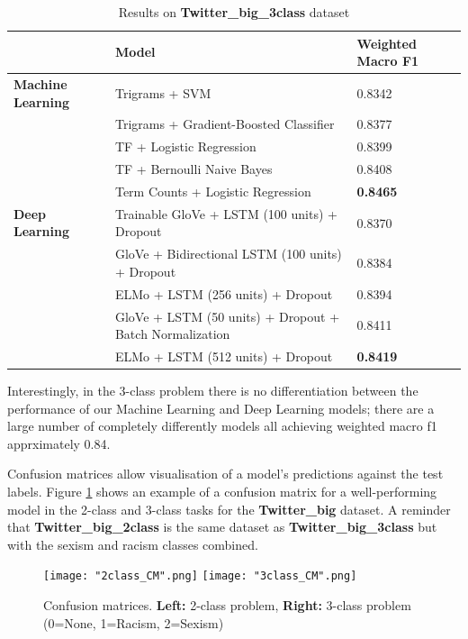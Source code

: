 \documentclass[12pt,a4paper]{article}
\begin{document}
\begin{table}[H]
	\centering
	\vspace*{-12pt}
	\caption{Results on \textbf{Twitter\_big\_3class} dataset}
	\label{results4}
	\hspace*{-1.5cm}
	\begin{tabular}{p{3.4cm} p{10.5cm} p{3.8cm}} \hline\hline
		& \textbf{Model} & \textbf{Weighted Macro F1}  \\ \hline
		
     \textbf{Machine Learning} & Trigrams + SVM & 0.8342 \\
	& Trigrams + Gradient-Boosted Classifier & 0.8377 \\
	& TF + Logistic Regression & 0.8399 \\
	& TF + Bernoulli Naive Bayes & 0.8408 \\
	& Term Counts + Logistic Regression & \textbf{0.8465} \\ \hline
	
	\textbf{Deep Learning} & Trainable GloVe + LSTM (100 units) + Dropout & 0.8370  \\  
	& GloVe + Bidirectional LSTM (100 units) + Dropout & 0.8384  \\
	& ELMo + LSTM (256 units) + Dropout & 0.8394  \\
	& GloVe + LSTM (50 units) + Dropout + Batch Normalization & 0.8411 \\ 
	& ELMo + LSTM (512 units) + Dropout & \textbf{0.8419} \\ \hline
	\end{tabular}
\end{table}

Interestingly, in the 3-class problem there is no differentiation between the performance of our Machine Learning and Deep Learning models; there are a large number of completely differently models all achieving weighted macro f1 apprximately 0.84.

Confusion matrices allow visualisation of a model's predictions against the test labels. Figure \ref{CM:CM2} shows an example of a confusion matrix for a well-performing model in the 2-class and 3-class tasks for the \textbf{Twitter\_big} dataset. A reminder that \textbf{Twitter\_big\_2class} is the same dataset as \textbf{Twitter\_big\_3class} but with the sexism and racism classes combined.

\begin{figure}[H]
	\centering
	\texttt{[image: "2class\_CM".png]} 
	\hspace*{0.05\textwidth}
	\texttt{[image: "3class\_CM".png]}
	\vspace*{-0.5cm}

	\caption{Confusion matrices. \newline\textbf{Left:} 2-class problem, \textbf{Right:} 3-class problem (0=None, 1=Racism, 2=Sexism)}
	\label{CM:CM2}
\end{figure}
\end{document}
